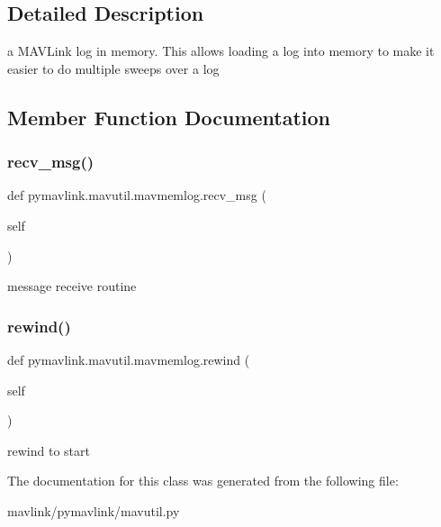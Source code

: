 \subsection{Detailed Description}
\begin{DoxyVerb}a MAVLink log in memory. This allows loading a log into
memory to make it easier to do multiple sweeps over a log\end{DoxyVerb}
 

\subsection{Member Function Documentation}
\mbox{\label{classpymavlink_1_1mavutil_1_1mavmemlog_a7a84e52fc8bf9a84624c848c4a2229da}} 
\subsubsection{\texorpdfstring{recv\+\_\+msg()}{recv\_msg()}}
{\footnotesize\ttfamily def pymavlink.\+mavutil.\+mavmemlog.\+recv\+\_\+msg (\begin{DoxyParamCaption}\item[{}]{self }\end{DoxyParamCaption})}

\begin{DoxyVerb}message receive routine\end{DoxyVerb}
 \mbox{\label{classpymavlink_1_1mavutil_1_1mavmemlog_ac3a0c1c0621a7b6ed341779bd313d493}} 
\subsubsection{\texorpdfstring{rewind()}{rewind()}}
{\footnotesize\ttfamily def pymavlink.\+mavutil.\+mavmemlog.\+rewind (\begin{DoxyParamCaption}\item[{}]{self }\end{DoxyParamCaption})}

\begin{DoxyVerb}rewind to start\end{DoxyVerb}
 

The documentation for this class was generated from the following file\+:\begin{DoxyCompactItemize}
\item 
mavlink/pymavlink/mavutil.\+py\end{DoxyCompactItemize}
